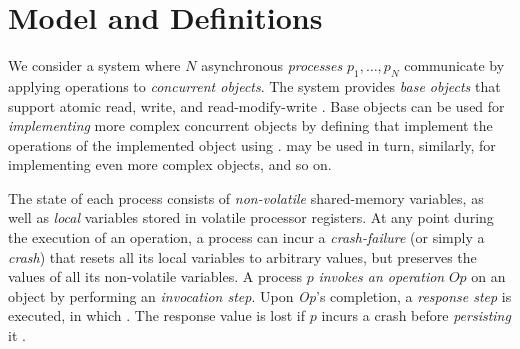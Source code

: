 
\section{Model and Definitions}
\label{section: Model}


We consider a system where $N$ asynchronous \textit{processes} $p_1, \ldots, p_{N}$
communicate by applying operations to \emph{concurrent objects}. The system provides
\textit{base objects} that support atomic read, write, and read-modify-write .
Base objects can be used for {\em implementing} more complex concurrent objects
by defining  that implement
the operations of the implemented object using .
may be used in turn, similarly, for implementing even more complex objects,
and so on.

The state of each process consists of {\em non-volatile} shared-memory variables,
as well as \emph{local} variables stored in volatile processor registers.
At any point during the execution of an operation,
a process can incur  a \emph{crash-failure}
(or simply a \emph{crash}) that resets all its local variables to arbitrary values,
but preserves the values of all its non-volatile variables.
A process $p$ \emph{invokes an operation} $Op$ on an object by performing
an \emph{invocation step}. Upon \emph{Op}'s completion, a \emph{response step}
is executed, in which .
The response value is lost if $p$ incurs a crash before {\em persisting} it
.


